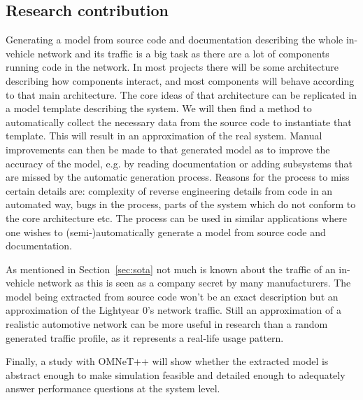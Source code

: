 \subsection{Research contribution}
\label{sec:research_contribution}
Generating a model from source code and documentation describing the whole in-vehicle network and its traffic is a big task as there are a lot of components running code in the network. In most projects there will be some architecture describing how components interact, and most components will behave according to that main architecture. The core ideas of that architecture can be replicated in a model template describing the system. We will then find a method to automatically collect the necessary data from the source code to instantiate that template. This will result in an approximation of the real system. Manual improvements can then be made to that generated model as to improve the accuracy of the model, e.g. by reading documentation or adding subsystems that are missed by the automatic generation process. Reasons for the process to miss certain details are: complexity of reverse engineering details from code in an automated way, bugs in the process, parts of the system which do not conform to the core architecture etc. The process can be used in similar applications where one wishes to (semi-)automatically generate a model from source code and documentation.

As mentioned in Section~\ref{sec:sota} not much is known about the traffic of an in-vehicle network as this is seen as a company secret by many manufacturers. The model being extracted from source code won't be an exact description but an approximation of the Lightyear 0's network traffic. Still an approximation of a realistic automotive network can be more useful in research than a random generated traffic profile, as it represents a real-life usage pattern. 

Finally, a study with OMNeT++ will show whether the extracted model is abstract enough to make simulation feasible and detailed enough to adequately answer performance questions at the system level.